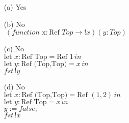 \documentclass{article}
\begin{document}
\begin{description}
            \begin{enumerate}
                \item [(a)]{Yes}
                \item[(b)]{No}\\
                $\ (function \text{ x}: \text{Ref }Top \rightarrow !x)(y:Top)$
                \item[(c)] {No}\\
                $\text{let } x: \text{Ref Top} = \text{Ref } 1 \, in $\\
                $\text{let } y: \text{Ref (Top,Top)} = x\, in$\\
                $fst\, !y$
                \item[(d)] {No}\\
                $\text{let } x: \text{Ref (Top,Top)} = \text{Ref } (1,2) \, in $\\
                $\text{let } y: \text{Ref Top} = x \,in$\\
                $y:=false;$\\
                $fst\, !x$
            \end{enumerate}
    \end{description}
\end{document}
